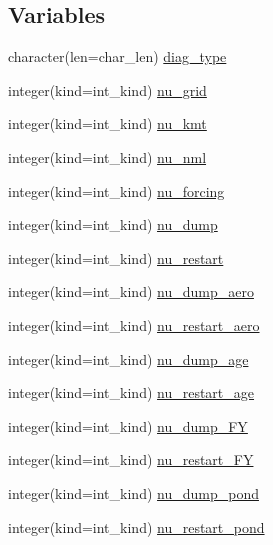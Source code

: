 \subsection*{Variables}
\begin{DoxyCompactItemize}
\item 
character(len=char\_\-len) \hyperlink{namespaceice__fileunits_af588ef6b480e0e304e6b78cfd39aa602}{diag\_\-type}
\item 
integer(kind=int\_\-kind) \hyperlink{namespaceice__fileunits_a18ec8e581589b8dbeb70fbc61ae4a293}{nu\_\-grid}
\item 
integer(kind=int\_\-kind) \hyperlink{namespaceice__fileunits_aaedfa4e4a189894dfedd14d7feabe219}{nu\_\-kmt}
\item 
integer(kind=int\_\-kind) \hyperlink{namespaceice__fileunits_a1c0f914707e7a61a579be21df178f061}{nu\_\-nml}
\item 
integer(kind=int\_\-kind) \hyperlink{namespaceice__fileunits_a946485641238cb0c4d99bb164de395eb}{nu\_\-forcing}
\item 
integer(kind=int\_\-kind) \hyperlink{namespaceice__fileunits_a025a35472bb3adec583dbd13beddfa57}{nu\_\-dump}
\item 
integer(kind=int\_\-kind) \hyperlink{namespaceice__fileunits_ae4a1de3342cf6bce1bd90d7517833d5d}{nu\_\-restart}
\item 
integer(kind=int\_\-kind) \hyperlink{namespaceice__fileunits_a8232286371f4a1cf56670431049eec01}{nu\_\-dump\_\-aero}
\item 
integer(kind=int\_\-kind) \hyperlink{namespaceice__fileunits_ada7b0914203fb0183cdf612624f0df75}{nu\_\-restart\_\-aero}
\item 
integer(kind=int\_\-kind) \hyperlink{namespaceice__fileunits_aed4fd8df7055b78ad592b4395acb95a0}{nu\_\-dump\_\-age}
\item 
integer(kind=int\_\-kind) \hyperlink{namespaceice__fileunits_a89e50699c9cae8e65d7fadbc1f065677}{nu\_\-restart\_\-age}
\item 
integer(kind=int\_\-kind) \hyperlink{namespaceice__fileunits_aa4b048a7f0b7630f6ecfb8c0e183cbaa}{nu\_\-dump\_\-FY}
\item 
integer(kind=int\_\-kind) \hyperlink{namespaceice__fileunits_af4ce2955d95671c93625715de173b82a}{nu\_\-restart\_\-FY}
\item 
integer(kind=int\_\-kind) \hyperlink{namespaceice__fileunits_a69cd946de2cd0d55f727d51f55a03052}{nu\_\-dump\_\-pond}
\item 
integer(kind=int\_\-kind) \hyperlink{namespaceice__fileunits_a9eb37e0f01221f9f3d7925da1c0838c0}{nu\_\-restart\_\-pond}

\end{DoxyCompactItemize}
